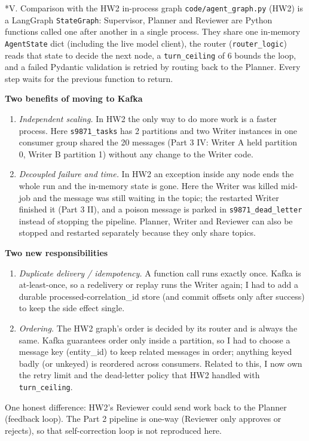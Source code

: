 \documentclass[11pt]{article}
\makeatletter
\renewcommand\subsection{\@startsection{subsection}{2}{\z@}{-2.2ex \@plus -1ex \@minus -.2ex}{0.8ex \@plus.2ex}{\normalfont\fontsize{12}{14.5}\selectfont\bfseries}}
\makeatother
\begin{document}
\subsection*{V. Comparison with the HW2 in-process graph}
\texttt{code/\allowbreak{}agent\_\allowbreak{}graph.py} (HW2) is a LangGraph \texttt{StateGraph}: Supervisor, Planner and Reviewer are Python functions called one after another in a single process. They share one in-memory \texttt{AgentState} dict (including the live model client), the router (\texttt{router\_\allowbreak{}logic}) reads that state to decide the next node, a \texttt{turn\_\allowbreak{}ceiling} of 6 bounds the loop, and a failed Pydantic validation is retried by routing back to the Planner. Every step waits for the previous function to return.

\textbf{Two benefits of moving to Kafka}

\begin{enumerate}\setlength\itemsep{2pt}
\item \emph{Independent scaling.} In HW2 the only way to do more work is a faster process. Here \texttt{s9871\_\allowbreak{}tasks} has 2 partitions and two Writer instances in one consumer group shared the 20 messages (Part 3 IV: Writer A held partition 0, Writer B partition 1) without any change to the Writer code.
\item \emph{Decoupled failure and time.} In HW2 an exception inside any node ends the whole run and the in-memory state is gone. Here the Writer was killed mid-job and the message was still waiting in the topic; the restarted Writer finished it (Part 3 II), and a poison message is parked in \texttt{s9871\_\allowbreak{}dead\_\allowbreak{}letter} instead of stopping the pipeline. Planner, Writer and Reviewer can also be stopped and restarted separately because they only share topics.
\end{enumerate}
\textbf{Two new responsibilities}

\begin{enumerate}\setlength\itemsep{2pt}
\item \emph{Duplicate delivery / idempotency.} A function call runs exactly once. Kafka is at-least-once, so a redelivery or replay runs the Writer again; I had to add a durable processed-correlation\_id store (and commit offsets only after success) to keep the side effect single.
\item \emph{Ordering.} The HW2 graph's order is decided by its router and is always the same. Kafka guarantees order only inside a partition, so I had to choose a message key (entity\_id) to keep related messages in order; anything keyed badly (or unkeyed) is reordered across consumers. Related to this, I now own the retry limit and the dead-letter policy that HW2 handled with \texttt{turn\_\allowbreak{}ceiling}.
\end{enumerate}
One honest difference: HW2's Reviewer could send work back to the Planner (feedback loop). The Part 2 pipeline is one-way (Reviewer only approves or rejects), so that self-correction loop is not reproduced here.
\end{document}
